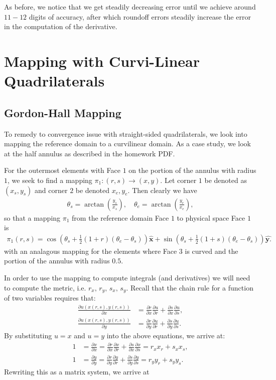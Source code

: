 \documentclass{article}
\newcommand{\pdiff}[2]{\frac{\partial {#1}}{\partial {#2}}}
\begin{document}
\noindent As before, we notice that we get steadily decreasing error until we achieve around $11-12$ digits of accuracy, after which roundoff errors steadily increase the error in the computation of the derivative. 

\section{Mapping with Curvi-Linear Quadrilaterals}

\subsection{Gordon-Hall Mapping}
\noindent To remedy to convergence issue with straight-sided quadrilaterals, we look into mapping the reference domain to a curvilinear domain. As a case study, we look at the half annulus as described in the homework PDF. 

For the outermost elements with Face $1$ on the portion of the annulus with radius $1$, we seek to find a mapping $\pi_1 : (r,s) \to (x,y)$. Let corner $1$ be denoted as $(x_s,y_s)$ and corner $2$ be denoted $x_e,y_e$. Then clearly we have 
  \begin{align*}
    \theta _s = \arctan \left(\frac{y_s}{x_s}\right), \quad \theta_e = \arctan \left(\frac{y_e}{x_e}\right),
  \end{align*}
so that a mapping $\pi_1$ from the reference domain Face $1$ to physical space Face $1$ is
  \begin{align*}
    \pi_1(r,s) = \cos \left( \theta_s + \frac{1}{2}(1 + r)(\theta_e - \theta_s) \right) \hat{\textbf{x}} + \sin \left( \theta_s + \frac{1}{2}(1 + s)(\theta_e - \theta_s) \right) \hat{\textbf{y.}}
  \end{align*}
with an analagous mapping for the elements where Face $3$ is curved and the portion of the annulus with radius $0.5$.

In order to use the mapping to compute integrals (and derivatives) we will need to compute the metric, i.e. $r_x, \, r_y, \, s_x, \, s_y$. Recall that the chain rule for a function of two variables requires that:
  \begin{align*}
    \pdiff{u(x(r,s),y(r,s))}{x} & = \pdiff{r}{x}\pdiff{u}{r} + \pdiff{s}{x} \pdiff{u}{s}, \\
    \pdiff{u(x(r,s),y(r,s))}{y} & = \pdiff{r}{y}\pdiff{u}{r} + \pdiff{s}{y} \pdiff{u}{s}.
  \end{align*}
By substituting $u = x$ and $u = y$ into the above equations, we arrive at:
  \begin{align*}
    1 & = \pdiff{x}{x} = \pdiff{r}{x}\pdiff{x}{r} + \pdiff{s}{x} \pdiff{x}{s} = r_x x_r + s_x x_s, \\
    1 & = \pdiff{y}{y}  = \pdiff{r}{y}\pdiff{y}{r} + \pdiff{s}{y} \pdiff{y}{s} = r_y y_r + s_y y_s.  
  \end{align*}
Rewriting this as a matrix system, we arrive at 
\end{document}

